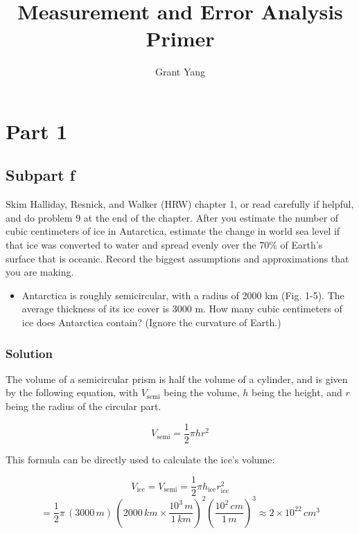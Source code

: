 \documentclass[12pt]{article}
\begin{document}
 
%
%

 
\title{Measurement and Error Analysis Primer} %
\author{Grant Yang} %
\maketitle


\section{Part 1}

\subsection{Subpart f}
Skim Halliday, Resnick, and Walker (HRW) chapter 1, or read carefully if helpful, and do problem 9 at the end of the chapter.  After you estimate the number of cubic centimeters of ice in Antarctica, estimate the change in world sea level if that ice was converted to water and spread evenly over the 70\% of Earth’s surface that is oceanic.  Record the biggest assumptions and approximations that you are making.

\begin{itemize}
\item Antarctica is roughly semicircular, with a radius of 2000 km (Fig. 1-5). The average thickness of its ice cover is 3000 m. How many cubic centimeters of ice does Antarctica contain? (Ignore the curvature of Earth.)
\end{itemize}

\subsubsection{Solution}

The volume of a semicircular prism is half the volume of a cylinder, and  is given by the following equation, with $V_\text{semi}$ being the volume, $h$ being the height, and $r$ being the radius of the circular part.

\[
V_\text{semi} = \frac{1}{2} \pi h r^2
\]

This formula can be directly used to calculate the ice's volume:

\[
V_\text{ice} =  V_\text{semi} = \frac{1}{2} \pi h_\text{ice} r_\text{ice}^2 \]\[= \frac{1}{2} \pi\,\left(3000\,\si{m}\right)\,\left(2000\,\si{km} \times \frac{10^3\,\si{m}}{1\,\si{km}}\right)^2 \left(\frac{10^2\,\si{cm}}{1\,\si{m}}\right)^3 \approx \boxed{2 \times 10^{22}\,\si{cm^3}}
\]
\end{document}

